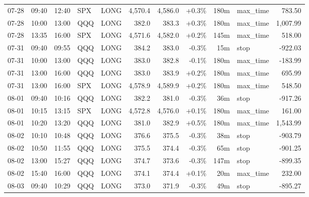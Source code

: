 \documentclass[11pt,a4paper,twoside]{article}
\begin{document}
\begin{center}
\begin{longtable}{>{\color{txtmain}}l l l l l r r r r >{\color{txtmain}}l r}
07-28 & 09:40 & 12:40 & SPX & LONG & 4,570.4 & 4,586.0 & \textcolor{wingreen}{+0.3\%} & 180m & max\_time & \textcolor{wingreen}{783.50} \\
07-28 & 10:00 & 13:00 & QQQ & LONG & 382.0 & 383.3 & \textcolor{wingreen}{+0.3\%} & 180m & max\_time & \textcolor{wingreen}{1,007.99} \\
07-28 & 13:35 & 16:00 & SPX & LONG & 4,571.6 & 4,582.0 & \textcolor{wingreen}{+0.2\%} & 145m & max\_time & \textcolor{wingreen}{518.00} \\
07-31 & 09:40 & 09:55 & QQQ & LONG & 384.2 & 383.0 & \textcolor{lossred}{-0.3\%} & 15m & stop & \textcolor{lossred}{-922.03} \\
07-31 & 10:00 & 13:00 & QQQ & LONG & 383.0 & 382.8 & \textcolor{lossred}{-0.1\%} & 180m & max\_time & \textcolor{lossred}{-183.99} \\
07-31 & 13:00 & 16:00 & QQQ & LONG & 383.0 & 383.9 & \textcolor{wingreen}{+0.2\%} & 180m & max\_time & \textcolor{wingreen}{695.99} \\
07-31 & 13:00 & 16:00 & SPX & LONG & 4,578.9 & 4,589.9 & \textcolor{wingreen}{+0.2\%} & 180m & max\_time & \textcolor{wingreen}{548.50} \\
08-01 & 09:40 & 10:16 & QQQ & LONG & 382.2 & 381.0 & \textcolor{lossred}{-0.3\%} & 36m & stop & \textcolor{lossred}{-917.26} \\
08-01 & 10:15 & 13:15 & SPX & LONG & 4,572.8 & 4,576.0 & \textcolor{wingreen}{+0.1\%} & 180m & max\_time & \textcolor{wingreen}{161.00} \\
08-01 & 10:20 & 13:20 & QQQ & LONG & 381.0 & 382.9 & \textcolor{wingreen}{+0.5\%} & 180m & max\_time & \textcolor{wingreen}{1,543.99} \\
08-02 & 10:10 & 10:48 & QQQ & LONG & 376.6 & 375.5 & \textcolor{lossred}{-0.3\%} & 38m & stop & \textcolor{lossred}{-903.79} \\
08-02 & 10:50 & 11:55 & QQQ & LONG & 375.5 & 374.4 & \textcolor{lossred}{-0.3\%} & 65m & stop & \textcolor{lossred}{-901.25} \\
08-02 & 13:00 & 15:27 & QQQ & LONG & 374.7 & 373.6 & \textcolor{lossred}{-0.3\%} & 147m & stop & \textcolor{lossred}{-899.35} \\
08-02 & 15:40 & 16:00 & QQQ & LONG & 374.1 & 374.4 & \textcolor{wingreen}{+0.1\%} & 20m & max\_time & \textcolor{wingreen}{232.00} \\
08-03 & 09:40 & 10:29 & QQQ & LONG & 373.0 & 371.9 & \textcolor{lossred}{-0.3\%} & 49m & stop & \textcolor{lossred}{-895.27} \\

\end{longtable}
\end{center}
\end{document}
